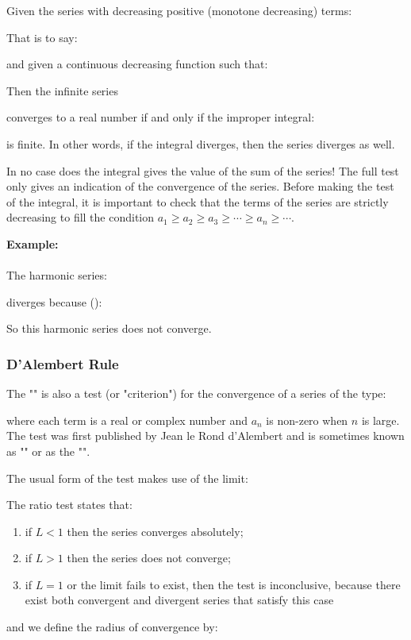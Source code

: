 	Given the series with decreasing positive (monotone decreasing) terms:
	
	That is to say:
	
	and given a continuous decreasing function such that:
	
	Then the infinite series
	
	converges to a real number if and only if the improper integral:
	
	is finite. In other words, if the integral diverges, then the series diverges as well.
	\begin{tcolorbox}[title=Remark,colframe=black,arc=10pt]
	In no case does the integral gives the value of the sum of the series! The full test only gives an indication of the convergence of the series. Before making the test of the integral, it is important to check that the terms of the series are strictly decreasing to fill the condition $a_1\ge a_2\ge a_3\ge \cdots\ge a_n\ge \cdots$.
	\end{tcolorbox}
	\begin{tcolorbox}[colframe=black,colback=white,sharp corners]
	\textbf{{\Large {}}Example:}\\\\
	The harmonic series:
	
	diverges because ():
	
	So this harmonic series does not converge.
	\end{tcolorbox}
	
	\subsubsection{D'Alembert Rule}
	The "" is also a test (or "criterion") for the convergence of a series of the type:
	
	where each term is a real or complex number and $a_n$ is non-zero when $n$ is large. The test was first published by Jean le Rond d'Alembert and is sometimes known as "" or as the "".
	
	The usual form of the test makes use of the limit:
	
 	The ratio test states that:
	\begin{enumerate}
		\item if $L < 1$ then the series converges absolutely;
		\item if $L > 1$ then the series does not converge;
		\item if $L = 1$ or the limit fails to exist, then the test is inconclusive, because there exist both convergent and divergent series that satisfy this case
	\end{enumerate}
	and we define the radius of convergence by:
	

